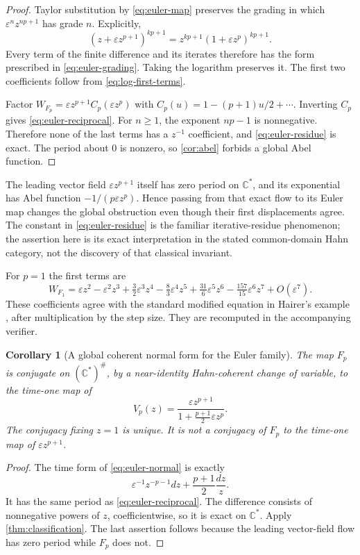 \documentclass[11pt,a4paper]{article}
\numberwithin{equation}{section}
\newtheorem{corollary}[corollary]{Corollary}
\theoremstyle{definition}
\theoremstyle{remark}
\newcommand{\C}{\mathbb C}
\newcommand{\eps}{\varepsilon}
\newcommand{\Oe}[1]{O(\eps^{#1})}
\begin{document}
\begin{proof}
Taylor substitution by \eqref{eq:euler-map} preserves the grading in which
$\eps^n z^{np+1}$ has grade $n$.  Explicitly,
\[
 (z+\eps z^{p+1})^{kp+1}
     =z^{kp+1}(1+\eps z^p)^{kp+1}.
\]
Every term of the finite difference and its iterates therefore has the
form prescribed in \eqref{eq:euler-grading}.  Taking the logarithm preserves
it.  The first two coefficients follow from
\eqref{eq:log-first-terms}.

Factor $W_{F_p}=\eps z^{p+1}C_p(\eps z^p)$ with
$C_p(u)=1-(p+1)u/2+\cdots$.  Inverting $C_p$ gives
\eqref{eq:euler-reciprocal}.  For $n\geq1$, the exponent $np-1$ is
nonnegative.  Therefore none of the last terms has a $z^{-1}$ coefficient,
and \eqref{eq:euler-residue} is exact.  The period about $0$ is nonzero,
so \cref{cor:abel} forbids a global Abel function.
\end{proof}

The leading vector field $\eps z^{p+1}$ itself has zero period on
$\C^*$, and its exponential has Abel function
$-1/(p\eps z^p)$.  Hence passing from that exact flow to its Euler map
changes the global obstruction even though their first displacements agree.
The constant in \eqref{eq:euler-residue} is the familiar iterative-residue
phenomenon; the assertion here is its exact interpretation in the stated
common-domain Hahn category, not the discovery of that classical invariant.

For $p=1$ the first terms are
\begin{equation}\label{eq:euler-known}
 W_{F_1}=\eps z^2-\eps^2z^3+\tfrac32\eps^3z^4
 -\tfrac83\eps^4z^5+\tfrac{31}{6}\eps^5z^6
 -\tfrac{157}{15}\eps^6z^7+\Oe7.
\end{equation}
These coefficients agree with the standard modified equation in Hairer's
example \cite{hairer}, after multiplication by the step size.  They are
recomputed in the accompanying verifier.

\begin{corollary}[A global coherent normal form for the Euler family]
\label{cor:euler-normal}
The map $F_p$ is conjugate on $(\C^*)^\#$, by a near-identity
Hahn-coherent change of variable, to the time-one map of
\begin{equation}\label{eq:euler-normal}
 V_p(z)=\frac{\eps z^{p+1}}
             {1+\frac{p+1}{2}\eps z^p}.
\end{equation}
The conjugacy fixing $z=1$ is unique.  It is not a conjugacy of $F_p$ to
the time-one map of $\eps z^{p+1}$.
\end{corollary}
\begin{proof}
The time form of \eqref{eq:euler-normal} is exactly
\[
 \eps^{-1}z^{-p-1}dz+\frac{p+1}{2}\frac{dz}{z}.
\]
It has the same period as \eqref{eq:euler-reciprocal}.
The difference consists of nonnegative powers of $z$, coefficientwise,
so it is exact on $\C^*$.  Apply \cref{thm:classification}.
The last assertion follows because the leading vector-field flow has zero
period while $F_p$ does not.
\end{proof}
\end{document}
